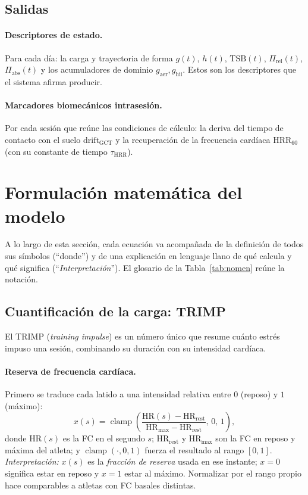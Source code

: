 \documentclass[11pt,a4paper]{article}
\DeclareMathOperator{\clamp}{clamp}
\begin{document}
\subsection{Salidas}

\paragraph{Descriptores de estado.} Para cada día: la carga y trayectoria de forma $g(t)$, $h(t)$, $\mathrm{TSB}(t)$, $\Pi_{\mathrm{rel}}(t)$, $\Pi_{\mathrm{abs}}(t)$ y los acumuladores de dominio $g_{\mathrm{aer}}, g_{\mathrm{hii}}$. Estos son los descriptores que el sistema afirma producir.

\paragraph{Marcadores biomecánicos intrasesión.} Por cada sesión que reúne las condiciones de cálculo: la deriva del tiempo de contacto con el suelo $\mathrm{drift}_{\mathrm{GCT}}$ y la recuperación de la frecuencia cardíaca $\mathrm{HRR}_{60}$ (con su constante de tiempo $\tau_{\mathrm{HRR}}$).

\newpage
\section{Formulación matemática del modelo}

A lo largo de esta sección, cada ecuación va acompañada de la definición de todos sus símbolos (``donde'') y de una explicación en lenguaje llano de qué calcula y qué significa (``\textit{Interpretación}''). El glosario de la Tabla~\ref{tab:nomen} reúne la notación.

\subsection{Cuantificación de la carga: TRIMP}
\label{sec:trimp}
El TRIMP (\emph{training impulse}) es un número único que resume cuánto estrés impuso una sesión, combinando su duración con su intensidad cardíaca.

\paragraph{Reserva de frecuencia cardíaca.} Primero se traduce cada latido a una intensidad relativa entre $0$ (reposo) y $1$ (máximo):
\begin{equation}
x(s) = \clamp\!\left(\frac{\mathrm{HR}(s) - \mathrm{HR}_{\mathrm{rest}}}{\mathrm{HR}_{\max} - \mathrm{HR}_{\mathrm{rest}}},\, 0,\, 1\right),
\label{eq:hrr}
\end{equation}
donde $\mathrm{HR}(s)$ es la FC en el segundo $s$; $\mathrm{HR}_{\mathrm{rest}}$ y $\mathrm{HR}_{\max}$ son la FC en reposo y máxima del atleta; y $\clamp(\cdot,0,1)$ fuerza el resultado al rango $[0,1]$. \textit{Interpretación:} $x(s)$ es la \emph{fracción de reserva} usada en ese instante; $x=0$ significa estar en reposo y $x=1$ estar al máximo. Normalizar por el rango propio hace comparables a atletas con FC basales distintas.
\end{document}
